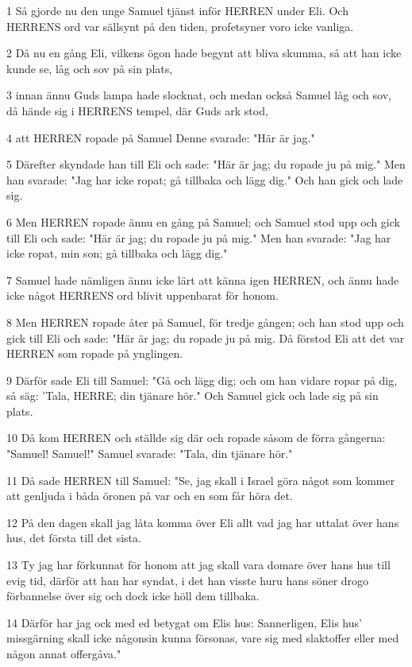 \par 1 Så gjorde nu den unge Samuel tjänst inför HERREN under Eli. Och HERRENS ord var sällsynt på den tiden, profetsyner voro icke vanliga.
\par 2 Då nu en gång Eli, vilkens ögon hade begynt att bliva skumma, så att han icke kunde se, låg och sov på sin plats,
\par 3 innan ännu Guds lampa hade slocknat, och medan också Samuel låg och sov, då hände sig i HERRENS tempel, där Guds ark stod,
\par 4 att HERREN ropade på Samuel Denne svarade: "Här är jag."
\par 5 Därefter skyndade han till Eli och sade: "Här är jag; du ropade ju på mig." Men han svarade: "Jag har icke ropat; gå tillbaka och lägg dig." Och han gick och lade sig.
\par 6 Men HERREN ropade ännu en gång på Samuel; och Samuel stod upp och gick till Eli och sade: "Här är jag; du ropade ju på mig." Men han svarade: "Jag har icke ropat, min son; gå tillbaka och lägg dig."
\par 7 Samuel hade nämligen ännu icke lärt att känna igen HERREN, och ännu hade icke något HERRENS ord blivit uppenbarat för honom.
\par 8 Men HERREN ropade åter på Samuel, för tredje gången; och han stod upp och gick till Eli och sade: "Här är jag; du ropade ju på mig. Då förstod Eli att det var HERREN som ropade på ynglingen.
\par 9 Därför sade Eli till Samuel: "Gå och lägg dig; och om han vidare ropar på dig, så säg: 'Tala, HERRE; din tjänare hör." Och Samuel gick och lade sig på sin plats.
\par 10 Då kom HERREN och ställde sig där och ropade såsom de förra gångerna: "Samuel! Samuel!" Samuel svarade: "Tala, din tjänare hör."
\par 11 Då sade HERREN till Samuel: "Se, jag skall i Israel göra något som kommer att genljuda i båda öronen på var och en som får höra det.
\par 12 På den dagen skall jag låta komma över Eli allt vad jag har uttalat över hans hus, det första till det sista.
\par 13 Ty jag har förkunnat för honom att jag skall vara domare över hans hus till evig tid, därför att han har syndat, i det han visste huru hans söner drogo förbannelse över sig och dock icke höll dem tillbaka.
\par 14 Därför har jag ock med ed betygat om Elis hus: Sannerligen, Elis hus' missgärning skall icke någonsin kunna försonas, vare sig med slaktoffer eller med någon annat offergåva."
